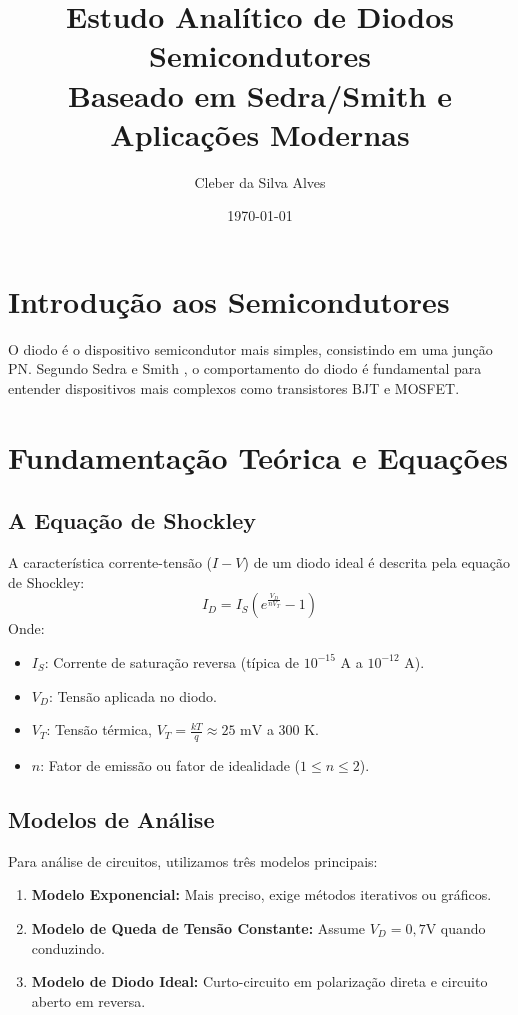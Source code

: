 \documentclass[12pt,a4paper]{article}
\title{Estudo Analítico de Diodos Semicondutores \\ \large Baseado em Sedra/Smith e Aplicações Modernas}
\author{Cleber da Silva Alves}
\date{\today}
\begin{document}
\maketitle

\section{Introdução aos Semicondutores}
O diodo é o dispositivo semicondutor mais simples, consistindo em uma junção PN. Segundo Sedra e Smith \cite{sedra}, o comportamento do diodo é fundamental para entender dispositivos mais complexos como transistores BJT e MOSFET.

\section{Fundamentação Teórica e Equações}
\subsection{A Equação de Shockley}
A característica corrente-tensão ($I-V$) de um diodo ideal é descrita pela equação de Shockley:
\begin{equation}
I_D = I_S \left( e^{\frac{V_D}{n V_T}} - 1 \right)
\end{equation}
Onde:
\begin{itemize}
    \item $I_S$: Corrente de saturação reversa (típica de $10^{-15}$ A a $10^{-12}$ A).
    \item $V_D$: Tensão aplicada no diodo.
    \item $V_T$: Tensão térmica, $V_T = \frac{kT}{q} \approx 25 \text{ mV}$ a 300 K.
    \item $n$: Fator de emissão ou fator de idealidade ($1 \leq n \leq 2$).
\end{itemize}

\subsection{Modelos de Análise}
Para análise de circuitos, utilizamos três modelos principais:
\begin{enumerate}
    \item \textbf{Modelo Exponencial:} Mais preciso, exige métodos iterativos ou gráficos.
    \item \textbf{Modelo de Queda de Tensão Constante:} Assume $V_D = 0,7\text{V}$ quando conduzindo.
    \item \textbf{Modelo de Diodo Ideal:} Curto-circuito em polarização direta e circuito aberto em reversa.
\end{enumerate}
\end{document}

